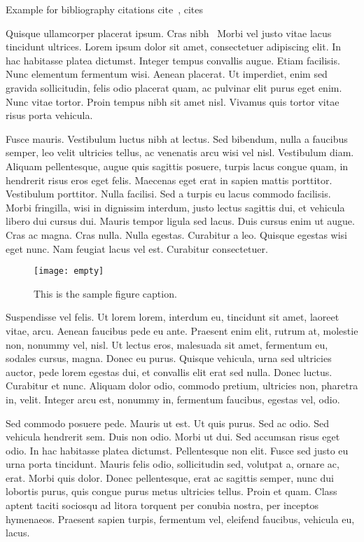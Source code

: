 \documentclass[AMS,STIX1COL]{WileyNJD-v2}
\begin{document}
Example for bibliography citations cite~\citep{Elbaum2002}, cites~\cite{Allen2011,Yoo2007}

Quisque ullamcorper placerat ipsum. Cras nibh~\cite{Yoo2007,Schulz2012} Morbi vel justo vitae lacus tincidunt ultrices. Lorem ipsum dolor sit
amet, consectetuer adipiscing elit. In hac habitasse platea dictumst. Integer tempus convallis augue. Etiam facilisis.
Nunc elementum fermentum wisi. Aenean placerat. Ut imperdiet, enim sed gravida sollicitudin, felis odio placerat
quam, ac pulvinar elit purus eget enim. Nunc vitae tortor. Proin tempus nibh sit amet nisl. Vivamus quis tortor
vitae risus porta vehicula.

Fusce mauris. Vestibulum luctus nibh at lectus. Sed bibendum, nulla a faucibus semper, leo velit ultricies tellus, ac
venenatis arcu wisi vel nisl. Vestibulum diam. Aliquam pellentesque, augue quis sagittis posuere, turpis lacus congue
quam, in hendrerit risus eros eget felis. Maecenas eget erat in sapien mattis porttitor. Vestibulum porttitor. Nulla facilisi. Sed a turpis eu lacus commodo facilisis. Morbi fringilla, wisi in dignissim interdum, justo lectus sagittis dui, et
vehicula libero dui cursus dui. Mauris tempor ligula sed lacus. Duis cursus enim ut augue. Cras ac magna. Cras nulla.
Nulla egestas. Curabitur a leo. Quisque egestas wisi eget nunc. Nam feugiat lacus vel est. Curabitur consectetuer.


\begin{figure}[t]
\centerline{\texttt{[image: empty]}}
\caption{This is the sample figure caption.\label{fig1}}
\end{figure}

Suspendisse vel felis. Ut lorem lorem, interdum eu, tincidunt sit amet, laoreet vitae, arcu. Aenean faucibus pede eu
ante. Praesent enim elit, rutrum at, molestie non, nonummy vel, nisl. Ut lectus eros, malesuada sit amet, fermentum
eu, sodales cursus, magna. Donec eu purus. Quisque vehicula, urna sed ultricies auctor, pede lorem egestas dui, et
convallis elit erat sed nulla. Donec luctus. Curabitur et nunc. Aliquam dolor odio, commodo pretium, ultricies non,
pharetra in, velit. Integer arcu est, nonummy in, fermentum faucibus, egestas vel, odio.

Sed commodo posuere pede. Mauris ut est. Ut quis purus. Sed ac odio. Sed vehicula hendrerit sem. Duis non
odio. Morbi ut dui. Sed accumsan risus eget odio. In hac habitasse platea dictumst. Pellentesque non elit. Fusce
sed justo eu urna porta tincidunt. Mauris felis odio, sollicitudin sed, volutpat a, ornare ac, erat. Morbi quis dolor.
Donec pellentesque, erat ac sagittis semper, nunc dui lobortis purus, quis congue purus metus ultricies tellus. Proin
et quam. Class aptent taciti sociosqu ad litora torquent per conubia nostra, per inceptos hymenaeos. Praesent sapien
turpis, fermentum vel, eleifend faucibus, vehicula eu, lacus.
\end{document}
